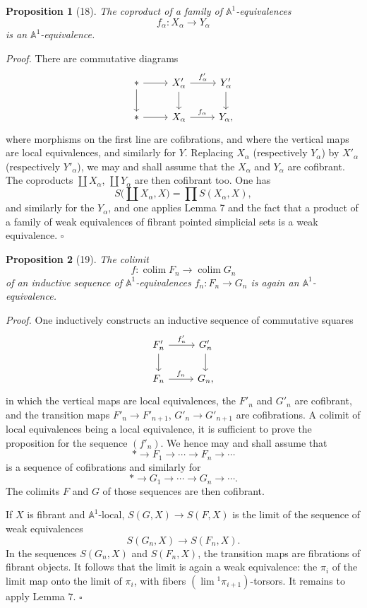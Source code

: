 \documentclass[11pt]{article}
\newcommand{\Aone}{\mathbb A^1}
\theoremstyle{deligne}
\newtheorem*{proposition*}{Proposition}
\newenvironment{proofdel}{\noindent\textit{Proof.}}{\hfill$\square$}
\newcommand{\colim}{\operatorname{colim}}
\newcommand{\limi}{\operatorname{lim}}
\begin{document}
\begin{proposition*}[18]
The coproduct of a family of \(\Aone\)-equivalences
\[
f_\alpha:X_\alpha\longrightarrow Y_\alpha
\]
is an \(\Aone\)-equivalence.
\end{proposition*}

\begin{proofdel}
There are commutative diagrams
\[
\begin{tikzcd}[column sep=2.5em,row sep=1.8em]
* \arrow[r] \arrow[d] & X'_\alpha \arrow[r,"f'_\alpha"] \arrow[d] & Y'_\alpha \arrow[d] \\
* \arrow[r] & X_\alpha \arrow[r,"f_\alpha"] & Y_\alpha,
\end{tikzcd}
\]
where morphisms on the first line are cofibrations, and where the vertical maps are local equivalences, and similarly for \(Y\). Replacing \(X_\alpha\) (respectively \(Y_\alpha\)) by \(X'_\alpha\) (respectively \(Y'_\alpha\)), we may and shall assume that the \(X_\alpha\) and \(Y_\alpha\) are cofibrant. The coproducts \(\coprod X_\alpha\), \(\coprod Y_\alpha\) are then cofibrant too. One has
\[
S\bigl(\coprod X_\alpha,X\bigr)=\prod S(X_\alpha,X),
\]
and similarly for the \(Y_\alpha\), and one applies Lemma 7 and the fact that a product of a family of weak equivalences of fibrant pointed simplicial sets is a weak equivalence.
\end{proofdel}

\begin{proposition*}[19]
The colimit
\[
f:\colim F_n\longrightarrow\colim G_n
\]
of an inductive sequence of \(\Aone\)-equivalences \(f_n:F_n\to G_n\) is again an \(\Aone\)-equivalence.
\end{proposition*}

\begin{proofdel}
One inductively constructs an inductive sequence of commutative squares
\[
\begin{tikzcd}[column sep=2.5em,row sep=1.8em]
F'_n \arrow[r,"f'_n"] \arrow[d] & G'_n \arrow[d] \\
F_n \arrow[r,"f_n"] & G_n,
\end{tikzcd}
\]
in which the vertical maps are local equivalences, the \(F'_n\) and \(G'_n\) are cofibrant, and the transition maps \(F'_n\to F'_{n+1}\), \(G'_n\to G'_{n+1}\) are cofibrations. A colimit of local equivalences being a local equivalence, it is sufficient to prove the proposition for the sequence \((f'_n)\). We hence may and shall assume that
\[
*\longrightarrow F_1\longrightarrow\cdots\longrightarrow F_n\longrightarrow\cdots
\]
is a sequence of cofibrations and similarly for
\[
*\longrightarrow G_1\longrightarrow\cdots\longrightarrow G_n\longrightarrow\cdots.
\]
The colimits \(F\) and \(G\) of those sequences are then cofibrant.

If \(X\) is fibrant and \(\Aone\)-local, \(S(G,X)\to S(F,X)\) is the limit of the sequence of weak equivalences
\[
S(G_n,X)\longrightarrow S(F_n,X).
\]
In the sequences \(S(G_n,X)\) and \(S(F_n,X)\), the transition maps are fibrations of fibrant objects. It follows that the limit is again a weak equivalence: the \(\pi_i\) of the limit map onto the limit of \(\pi_i\), with fibers \((\limi{}^1\pi_{i+1})\)-torsors. It remains to apply Lemma 7.
\end{proofdel}
\end{document}

